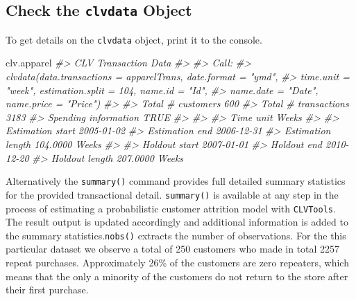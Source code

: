 \documentclass[
]{article}
\newenvironment{Shaded}{\begin{snugshade}}{\end{snugshade}}
\newcommand{\CommentTok}[1]{\textcolor[rgb]{0.56,0.35,0.01}{\textit{#1}}}
\newcommand{\NormalTok}[1]{#1}
\begin{document}
\subsection{\texorpdfstring{Check the \texttt{clvdata}
Object}{Check the clvdata Object}}\label{check-the-clvdata-object}

To get details on the \texttt{clvdata} object, print it to the console.

\begin{Shaded}
\begin{Highlighting}[]
\NormalTok{clv.apparel}
\CommentTok{\#\textgreater{} CLV Transaction Data }
\CommentTok{\#\textgreater{} }
\CommentTok{\#\textgreater{} Call:}
\CommentTok{\#\textgreater{} clvdata(data.transactions = apparelTrans, date.format = "ymd", }
\CommentTok{\#\textgreater{}     time.unit = "week", estimation.split = 104, name.id = "Id", }
\CommentTok{\#\textgreater{}     name.date = "Date", name.price = "Price")}
\CommentTok{\#\textgreater{}                          }
\CommentTok{\#\textgreater{} Total \# customers    600 }
\CommentTok{\#\textgreater{} Total \# transactions 3183}
\CommentTok{\#\textgreater{} Spending information TRUE}
\CommentTok{\#\textgreater{} }
\CommentTok{\#\textgreater{}                                 }
\CommentTok{\#\textgreater{} Time unit         Weeks         }
\CommentTok{\#\textgreater{}                                 }
\CommentTok{\#\textgreater{} Estimation start  2005{-}01{-}02    }
\CommentTok{\#\textgreater{} Estimation end    2006{-}12{-}31    }
\CommentTok{\#\textgreater{} Estimation length 104.0000 Weeks}
\CommentTok{\#\textgreater{}                                 }
\CommentTok{\#\textgreater{} Holdout start     2007{-}01{-}01    }
\CommentTok{\#\textgreater{} Holdout end       2010{-}12{-}20    }
\CommentTok{\#\textgreater{} Holdout length    207.0000 Weeks}
\end{Highlighting}
\end{Shaded}

Alternatively the \texttt{summary()} command provides full detailed
summary statistics for the provided transactional detail.
\texttt{summary()} is available at any step in the process of estimating
a probabilistic customer attrition model with \texttt{CLVTools}. The
result output is updated accordingly and additional information is added
to the summary statistics.\texttt{nobs()} extracts the number of
observations. For the this particular dataset we observe a total of 250
customers who made in total 2257 repeat purchases. Approximately 26\% of
the customers are zero repeaters, which means that the only a minority
of the customers do not return to the store after their first purchase.
\end{document}
